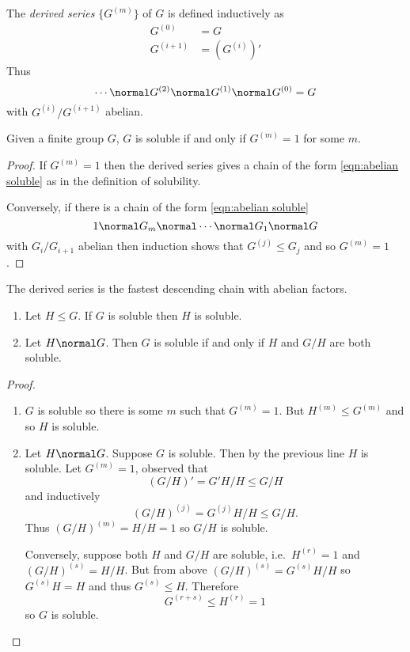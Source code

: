 \documentclass[a4paper]{article}
\begin{document}
\begin{definition}
  The \emph{derived series} \(\{G^{(m)}\}\) of \(G\) is defined inductively as
  \begin{align*}
    G^{(0)} &= G \\
    G^{(i + 1)} &= (G^{(i)})'
  \end{align*}
  Thus
  \[
    \cdots \normal G^{(2)} \normal G^{(1)} \normal G^{(0)} = G
  \]
  with \(G^{(i)}/G^{(i + 1)}\) abelian.
\end{definition}

\begin{lemma}
  Given a finite group \(G\), \(G\) is soluble if and only if \(G^{(m)} = 1\) for some \(m\).
\end{lemma}

\begin{proof}
  If \(G^{(m)} = 1\) then the derived series gives a chain of the form \eqref{eqn:abelian soluble} as in the definition of solubility.

  Conversely, if there is a chain of the form \eqref{eqn:abelian soluble}
  \[
    1 \normal G_m \normal \cdots \normal G_1 \normal G
  \]
  with \(G_i/G_{i + 1}\) abelian then induction shows that \(G^{(j)} \leq G_j\) and so \(G^{(m)} = 1\).
\end{proof}

\begin{remark}
  The derived series is the fastest descending chain with abelian factors.
\end{remark}

\begin{lemma}\leavevmode
  \begin{enumerate}
  \item Let \(H \leq G\). If \(G\) is soluble then \(H\) is soluble.
  \item Let \(H \normal G\). Then \(G\) is soluble if and only if \(H\) and \(G/H\) are both soluble.
  \end{enumerate}
\end{lemma}

\begin{proof}\leavevmode
  \begin{enumerate}
  \item \(G\) is soluble so there is some \(m\) such that \(G^{(m)} = 1\). But \(H^{(m)} \leq G^{(m)}\) and so \(H\) is soluble.
  \item Let \(H \normal G\). Suppose \(G\) is soluble. Then by the previous line \(H\) is soluble. Let \(G^{(m)} = 1\), observed that
    \[
      (G/H)' = G'H/H \leq G/H
    \]
    and inductively
    \[
      (G/H)^{(j)} = G^{(j)}H/H \leq G/H.
    \]
    Thus \((G/H)^{(m)} = H/H = 1\) so \(G/H\) is soluble.

    Conversely, suppose both \(H\) and \(G/H\) are soluble, i.e.\ \(H^{(r)} = 1\) and \((G/H)^{(s)} = H/H\). But from above \((G/H)^{(s)} = G^{(s)}H/H\) so \(G^{(s)}H = H\) and thus \(G^{(s)} \leq H\). Therefore
    \[
      G^{(r + s)} \leq H^{(r)} = 1
    \]
    so \(G\) is soluble.
  \end{enumerate}
\end{proof}
\end{document}

